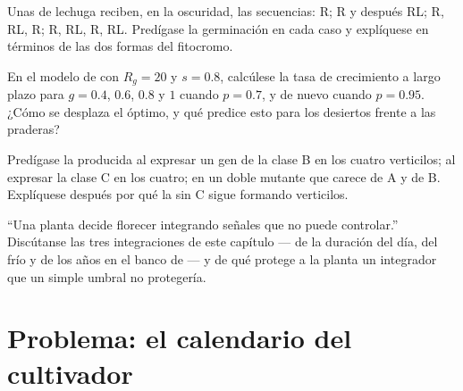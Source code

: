\begin{exercise}[$\star\star$]\label{exo:b2:plant-flowering:9}
Unas  de lechuga reciben, en la oscuridad, las secuencias: R; R y
después RL; R, RL, R; R, RL, R, RL. Predígase la germinación en cada caso
y explíquese en términos de las dos formas del fitocromo.
\end{exercise}

\begin{exercise}[$\star\star\star$]\label{exo:b2:plant-flowering:10}
En el modelo de  con $R_g = 20$ y $s = 0.8$,
calcúlese la tasa de crecimiento a largo plazo para $g = 0.4$, $0.6$,
$0.8$ y $1$ cuando $p = 0.7$, y de nuevo cuando $p = 0.95$. ¿Cómo se
desplaza el óptimo, y qué predice esto para los desiertos frente a las
praderas?
\end{exercise}

\begin{exercise}[$\star\star\star$]\label{exo:b2:plant-flowering:11}
Predígase la  producida al expresar un gen de la clase B en los cuatro
verticilos; al expresar la clase C en los cuatro; en un doble mutante que
carece de A y de B. Explíquese después por qué la  sin C sigue
formando verticilos.
\end{exercise}

\begin{exercise}[$\star\star\star$]\label{exo:b2:plant-flowering:12}
``Una planta decide florecer integrando señales que no puede controlar.''
Discútanse las tres integraciones de este capítulo --- de la duración del
día, del frío y de los años en el banco de  --- y de qué protege
a la planta un integrador que un simple umbral no protegería.
\end{exercise}

\section{Problema: el calendario del cultivador}

